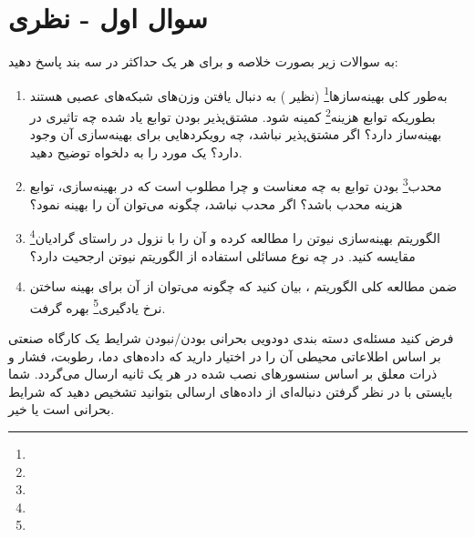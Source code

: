 \section{سوال اول - نظری}
به سوالات زیر بصورت خلاصه و برای هر یک حداکثر در سه بند پاسخ دهید:

\begin{enumerate}
	\item 
به‌طور کلی بهینه‌سازها\footnote{} (نظیر ) به دنبال یافتن وزن‌های شبکه‌های عصبی هستند بطوریکه توابع هزینه\footnote{} کمینه شود. مشتق‌پذیر بودن توابع یاد شده چه تاثیری در بهینه‌ساز دارد؟ اگر مشتق‌پذیر نباشد، چه رویکردهایی برای بهینه‌سازی آن وجود دارد؟ یک مورد را به دلخواه توضیح دهید.
	
	
	
	
	
	
	
	
	\item
محدب\footnote{} بودن توابع به چه معناست و چرا مطلوب است که در بهینه‌سازی، توابع هزینه محدب باشد؟ اگر محدب نباشد، چگونه می‌توان آن را بهینه نمود؟
	
	
	
	
	
	\item 
الگوریتم بهینه‌سازی نیوتن را مطالعه کرده و آن را با نزول در راستای گرادیان\footnote{} مقایسه کنید. در چه نوع مسائلی استفاده از الگوریتم نیوتن ارجحیت دارد؟
	
	
	
	
	
	
	
	\item
ضمن مطالعه کلی الگوریتم ، بیان کنید که چگونه می‌توان از آن برای بهینه ساختن نرخ یادگیری\footnote{} بهره گرفت.
\end{enumerate}

فرض کنید مسئله‌ی دسته بندی دودویی بحرانی بودن/نبودن شرایط یک کارگاه صنعتی بر اساس اطلاعاتی محیطی آن را در اختیار دارید که داده‌های دما، رطوبت، فشار و ذرات معلق بر اساس سنسورهای نصب شده در هر یک ثانیه ارسال می‌گردد. شما بایستی با در نظر گرفتن دنباله‌ای از داده‌های ارسالی بتوانید تشخیص دهید که شرایط بحرانی است یا خیر.





































